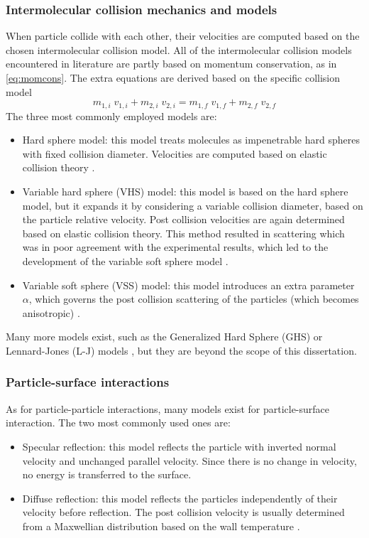 \subsubsection{Intermolecular collision mechanics and models}
When particle collide with each other, their velocities are computed based on the chosen intermolecular collision model. All of the intermolecular collision models encountered in literature are partly based on momentum conservation, as in \autoref{eq:momcons}. The extra equations are derived based on the specific collision model
\begin{equation}
    m_{1,i}\; v_{1,i} + m_{2,i}\; v_{2,i} = m_{1,f}\; v_{1,f} + m_{2,f}\; v_{2,f}
    \label{eq:momcons}
\end{equation}
The three most commonly employed models are:
\begin{itemize}
    \item Hard sphere model: this model treats molecules as impenetrable hard spheres with fixed collision diameter. Velocities are computed based on elastic collision theory \cite{collisionmodels}.
    \item Variable hard sphere (VHS) model: this model is based on the hard sphere model, but it expands it by considering a variable collision diameter, based on the particle relative velocity. Post collision velocities are again determined based on elastic collision theory. This method resulted in scattering which was in poor agreement with the experimental results, which led to the development of the variable soft sphere model \cite{collisionmodels}.
    \item Variable soft sphere (VSS) model: this model introduces an extra parameter $\alpha$, which governs the post collision scattering of the particles (which becomes anisotropic) \cite{collisionmodels}.
\end{itemize}

Many more models exist, such as the Generalized Hard Sphere (GHS) or Lennard-Jones (L-J) models \cite{collisionmodels}, but they are beyond the scope of this dissertation.

\subsubsection{Particle-surface interactions}
\label{subsection:partsurf}
As for particle-particle interactions, many models exist for particle-surface interaction. The two most commonly used ones are:
\begin{itemize}
    \item Specular reflection: this model reflects the particle with inverted normal velocity and unchanged parallel velocity. Since there is no change in velocity, no energy is transferred to the surface.
    \item Diffuse reflection: this model reflects the particles independently of their velocity before reflection. The post collision velocity is usually determined from a Maxwellian distribution based on the wall temperature \cite{bird, spartadoc}.
\end{itemize}

